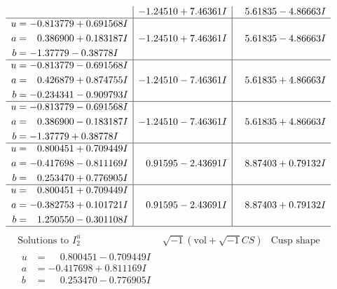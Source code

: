 \documentclass[1p]{elsarticle_modified}
\theoremstyle{definition}
\newcommand{\I}{\sqrt{-1}}
\begin{document}
$$\begin{array}{c|c|c}
 & -1.24510 + 7.46361 I & \phantom{-}5.61835 - 4.86663 I \\ \hline\begin{aligned}
u &= -0.813779 + 0.691568 I \\
a &= \phantom{-}0.386900 + 0.183187 I \\
b &= -1.37779 - 0.38778 I\end{aligned}
 & -1.24510 + 7.46361 I & \phantom{-}5.61835 - 4.86663 I \\ \hline\begin{aligned}
u &= -0.813779 - 0.691568 I \\
a &= \phantom{-}0.426879 + 0.874755 I \\
b &= -0.234341 - 0.909793 I\end{aligned}
 & -1.24510 - 7.46361 I & \phantom{-}5.61835 + 4.86663 I \\ \hline\begin{aligned}
u &= -0.813779 - 0.691568 I \\
a &= \phantom{-}0.386900 - 0.183187 I \\
b &= -1.37779 + 0.38778 I\end{aligned}
 & -1.24510 - 7.46361 I & \phantom{-}5.61835 + 4.86663 I \\ \hline\begin{aligned}
u &= \phantom{-}0.800451 + 0.709449 I \\
a &= -0.417698 - 0.811169 I \\
b &= \phantom{-}0.253470 + 0.776905 I\end{aligned}
 & \phantom{-}0.91595 - 2.43691 I & \phantom{-}8.87403 + 0.79132 I \\ \hline\begin{aligned}
u &= \phantom{-}0.800451 + 0.709449 I \\
a &= -0.382753 + 0.101721 I \\
b &= \phantom{-}1.250550 - 0.301108 I\end{aligned}
 & \phantom{-}0.91595 - 2.43691 I & \phantom{-}8.87403 + 0.79132 I\\
 \hline 
 \end{array}$$\newpage$$\begin{array}{c|c|c}  
\text{Solutions to }I^u_{2}& \I (\text{vol} + \sqrt{-1}CS) & \text{Cusp shape}\\
 \hline 
\begin{aligned}
u &= \phantom{-}0.800451 - 0.709449 I \\
a &= -0.417698 + 0.811169 I \\
b &= \phantom{-}0.253470 - 0.776905 I\end{aligned}

\end{array}$$
\end{document}
